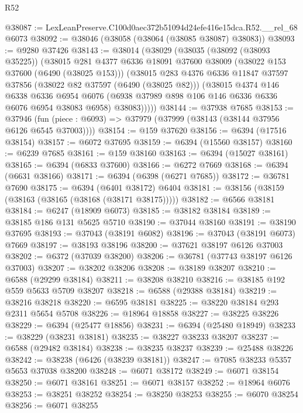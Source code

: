 \begin{lexlean}{R52}
\begin{coremodule}
@38087 := LexLeanPreserve.C100d0aec372b51094d24efe416e15dca.R52.__rel_68 @6073
@38092 := @38046 (@38058 (@38064 (@38085 @38087) @38083))
@38093 := @9280 @37426
@38143 := @38014
    (@38029
      (@38035
        (@38092 (@38093 @35225))
        (@38015
          @281
          @4377
          @6336
          @18091
          @37600
          @38009
          (@38022 @153 @37600 (@6490 (@38025 @153)))
          (@38015
            @283
            @4376
            @6336
            @11847
            @37597
            @37856
            (@38022 @82 @37597 (@6490 (@38025 @82)))
            (@38015
              @4374
              @146
              @6338
              @6336
              @6954
              @6076
              (@6938 @37989 @898 @106 @146 @6336 @6336 @6076 @6954 @38083 @6958)
              @38083)))))
@38144 := @37938 @7685
@38153 := @37946
    (fun (piece : @6093) => @37979 (@37999 (@38143 (@38144 @37956 @6126 @6545 @37003))))
@38154 := @159 @37620
@38156 := @6394 (@17516 @38154)
@38157 := @6072 @37695
@38159 := @6394 (@15560 @38157)
@38160 := @6239 @7685
@38161 := @159 @38160
@38163 := @6394 (@15027 @38161)
@38165 := @6394 (@6833 @37600)
@38166 := @6272 @7669
@38168 := @6394 (@6631 @38166)
@38171 := @6394 (@6398 (@6271 @7685))
@38172 := @36781 @7690
@38175 := @6394 (@6401 @38172) @6404
@38181 := @38156 (@38159 (@38163 (@38165 (@38168 (@38171 @38175)))))
@38182 := @6566 @38181
@38184 := @6247 (@18909 @6073)
@38185 := @38182 @38184
@38189 := @38185 @186 @131 @5625 @5710
@38190 := @37044 @38160
@38191 := @38190 @37695
@38193 := @37043 (@38191 @6082)
@38196 := @37043 (@38191 @6073) @7669
@38197 := @38193 @38196
@38200 := @37621 @38197 @6126 @37003
@38202 := @6372 (@37039 @38200)
@38206 := @36781 (@37743 @38197 @6126 @37003)
@38207 := @38202 @38206
@38208 := @38189 @38207
@38210 := @6588 (@29299 @38184)
@38211 := @38208 @38210
@38216 := @38185 @192 @559 @5633 @5709 @38207
@38218 := @6588 (@29388 @38184)
@38219 := @38216 @38218
@38220 := @6595 @38181
@38225 := @38220 @38184 @293 @2311 @5654 @5708
@38226 := @18964 @18858
@38227 := @38225 @38226
@38229 := @6394 (@25477 @18856)
@38231 := @6394 (@25480 @18949)
@38233 := @38229 (@38231 @38181)
@38235 := @38227 @38233 @38207
@38237 := @6588 (@29482 @38184)
@38238 := @38235 @38237
@38239 := @25488 @38226
@38242 := @38238 (@6426 (@38239 @38181))
@38247 := @7085 @38233 @5357 @5653 @37038 @38200
@38248 := @6071 @38172
@38249 := @6071 @38154
@38250 := @6071 @38161
@38251 := @6071 @38157
@38252 := @18964 @6076
@38253 := @38251 @38252
@38254 := @38250 @38253
@38255 := @6070 @38254
@38256 := @6071 @38255

\end{coremodule}
\end{lexlean}
